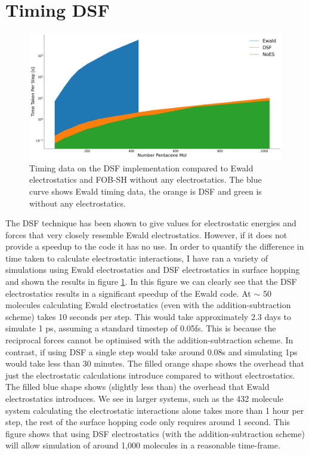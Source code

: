 \section{Timing DSF}
\begin{figure}[htp]
  \includegraphics[width=\textwidth]{../img/ES/SH_timing_wEwald.png}
  \caption{\label{fig:DSF_Timings}Timing data on the DSF implementation compared to Ewald electrostatics and FOB-SH without any electrostatics. The blue curve shows Ewald timing data, the orange is DSF and green is without any electrostatics.}
\end{figure}
\noindent The DSF technique has been shown to give values for electrostatic energies and forces that very closely resemble Ewald electrostatics. However, if it does not provide a speedup to the code it has no use. In order to quantify the difference in time taken to calculate electrostatic interactions, I have ran a variety of simulations using Ewald electrostatics and DSF electrostatics in surface hopping and shown the results in figure \ref{fig:DSF_Timings}. In this figure we can clearly see that the DSF electrostatics results in a significant speedup of the Ewald code. At $\sim$ 50 molecules calculating Ewald electrostatics (even with the addition-subtraction scheme) takes 10 seconds per step. This would take approximately 2.3 days to simulate 1 ps, assuming a standard timestep of 0.05fs. This is because the reciprocal forces cannot be optimised with the addition-subtraction scheme. In contrast, if using DSF a single step would take around 0.08s and simulating 1ps would take less than 30 minutes. The filled orange shape shows the overhead that just the electrostatic calculations introduce compared to without electrostatics. The filled blue shape shows (slightly less than) the overhead that Ewald electrostatics introduces. We see in larger systems, such as the 432 molecule system calculating the electrostatic interactions alone takes more than 1 hour per step, the rest of the surface hopping code only requires around 1 second. This figure shows that using DSF electrostatics (with the addition-subtraction scheme) will allow simulation of around 1,000 molecules in a reasonable time-frame.



